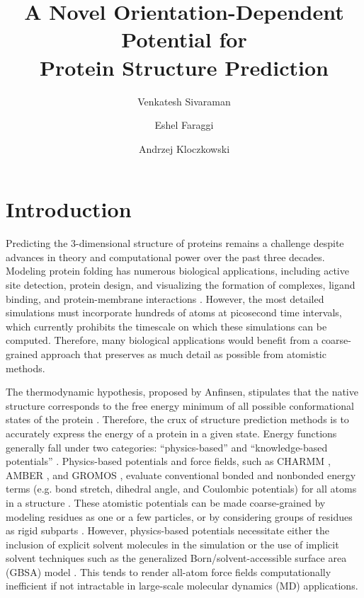 \documentclass[11pt,titlepage]{article}
\title{A Novel Orientation-Dependent Potential for \\Protein Structure Prediction}
\author[1]{Venkatesh Sivaraman}
\author[2,3]{Eshel Faraggi}
\author[3]{Andrzej Kloczkowski}
\affil[1]{Bexley High School}
\affil[2]{IUPUI}
\affil[3]{The Ohio State University}
\begin{document}
\maketitle

\raggedbottom

\begin{abstract}
\end{abstract}

\section{Introduction}
Predicting the 3-dimensional structure of proteins remains a challenge despite advances in theory and computational power over the past three decades.
Modeling protein folding has numerous biological applications, including active site detection, protein design, and visualizing the formation of complexes, ligand binding, and protein-membrane interactions \cite{baker2,kouza,monticelli}.
However, the most detailed simulations must incorporate hundreds of atoms at picosecond time intervals, which currently prohibits the timescale on which these simulations can be computed.
Therefore, many biological applications would benefit from a coarse-grained approach that preserves as much detail as possible from atomistic methods.

The thermodynamic hypothesis, proposed by Anfinsen, stipulates that the native structure corresponds to the free energy minimum of all possible conformational states of the protein \cite{anfinsen}.
Therefore, the crux of structure prediction methods is to accurately express the energy of a protein in a given state. 
Energy functions generally fall under two categories: ``physics-based'' and ``knowledge-based potentials'' \cite{lu}.
Physics-based potentials and force fields, such as CHARMM \cite{brooks}, AMBER \cite{amber}, and GROMOS \cite{gromos}, evaluate conventional bonded and nonbonded energy terms (e.g. bond stretch, dihedral angle, and Coulombic potentials) for all atoms in a structure \cite{brooks2}.
These atomistic potentials can be made coarse-grained by modeling residues as one or a few particles, or by considering groups of residues as rigid subparts \cite{basdevant,potestio,enciso,monticelli}.
However, physics-based potentials necessitate either the inclusion of explicit solvent molecules in the simulation \cite{onufriev} or the use of implicit solvent techniques such as the generalized Born/solvent-accessible surface area (GBSA) model \cite{feig,roux}.
This tends to render all-atom force fields computationally inefficient if not intractable in large-scale molecular dynamics (MD) applications.
\end{document}
